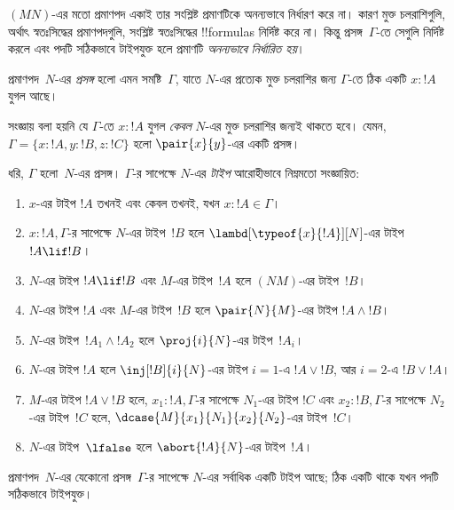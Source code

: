 \documentclass[../../../include/open-logic-section]{subfiles}
\begin{document}


$(MN)$-এর মতো প্রমাণপদ একাই তার
সংশ্লিষ্ট প্রমাণটিকে অনন্যভাবে নির্ধারণ
করে না। কারণ মুক্ত চলরাশিগুলি, অর্থাৎ
স্বতঃসিদ্ধের প্রমাণপদগুলি, সংশ্লিষ্ট
স্বতঃসিদ্ধের !!{formula}s নির্দিষ্ট করে
না। কিন্তু প্রসঙ্গ~$\Gamma$-তে সেগুলি
নির্দিষ্ট করলে এবং পদটি সঠিকভাবে টাইপযুক্ত হলে প্রমাণটি \emph{অনন্যভাবে
নির্ধারিত হয়}।

\begin{defn}
প্রমাণপদ~$N$-এর \emph{প্রসঙ্গ} হলো এমন
সমষ্টি~$\Gamma$, যাতে $N$-এর প্রত্যেক
মুক্ত চলরাশির জন্য $\Gamma$-তে ঠিক
একটি $x : !A$ যুগল আছে।
\end{defn}

সংজ্ঞায় বলা হয়নি যে $\Gamma$-তে
$x:!A$ যুগল \emph{কেবল} $N$-এর মুক্ত
চলরাশির জন্যই থাকতে হবে। যেমন,
$\Gamma = \{x:!A, y:!B, z:!C\}$
হলো $\pair{x}{y}$-এর একটি প্রসঙ্গ।

\begin{defn}
  ধরি, $\Gamma$ হলো~$N$-এর প্রসঙ্গ।
  $\Gamma$-র সাপেক্ষে $N$-এর \emph{টাইপ}
  আরোহীভাবে নিম্নমতো সংজ্ঞায়িত:
  \begin{enumerate}
  \item $x$-এর টাইপ $!A$ তখনই এবং কেবল
  তখনই, যখন $x:!A \in \Gamma$।
  \item $x:!A, \Gamma$-র সাপেক্ষে $N$-এর
  টাইপ~$!B$ হলে $\lambd[\typeof{x}{!A}][N]$-এর
  টাইপ $!A \lif !B$।
  \item $N$-এর টাইপ $!A \lif !B$ এবং $M$-এর
  টাইপ~$!A$ হলে $(NM)$-এর টাইপ~$!B$।
  \item $N$-এর টাইপ $!A$ এবং $M$-এর
  টাইপ~$!B$ হলে $\pair{N}{M}$-এর টাইপ
  $!A \land !B$।
  \item $N$-এর টাইপ~$!A_1 \land !A_2$
  হলে $\proj{i}{N}$-এর টাইপ~$!A_i$।
  \item $N$-এর টাইপ $!A$ হলে
    $\inj[!B]{i}{N}$-এর টাইপ $i=1$-এ
    $!A \lor !B$, আর $i=2$-এ
    $!B \lor !A$।
  \item $M$-এর টাইপ $!A \lor !B$ হলে,
  $x_1:!A, \Gamma$-র সাপেক্ষে $N_1$-এর
  টাইপ $!C$ এবং $x_2:!B,\Gamma$-র
  সাপেক্ষে $N_2$-এর টাইপ~$!C$ হলে,
  $\dcase{M}{x_1}{N_1}{x_2}{N_2}$-এর টাইপ~$!C$।
  \item $N$-এর টাইপ~$\lfalse$ হলে
    $\abort{!A}{N}$-এর টাইপ~$!A$।
  \end{enumerate}
\end{defn}

\begin{prop}
প্রমাণপদ~$N$-এর যেকোনো প্রসঙ্গ~$\Gamma$-র
সাপেক্ষে $N$-এর সর্বাধিক একটি টাইপ আছে;
ঠিক একটি থাকে যখন পদটি সঠিকভাবে টাইপযুক্ত।
\end{prop}
\end{document}

